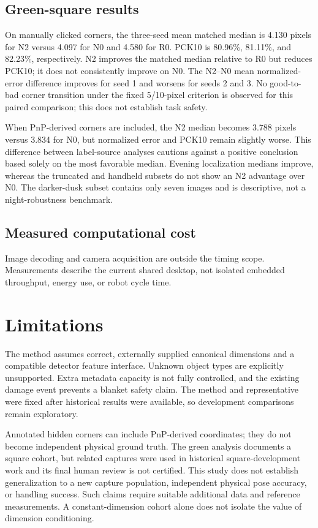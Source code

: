 \documentclass[journal]{IEEEtran}
\begin{document}
\subsection{Green-square results}

On manually clicked corners, the three-seed mean matched median is 4.130 pixels for N2 versus 4.097 for N0 and 4.580 for R0. PCK10 is 80.96\%, 81.11\%, and 82.23\%, respectively. N2 improves the matched median relative to R0 but reduces PCK10; it does not consistently improve on N0. The N2--N0 mean normalized-error difference improves for seed 1 and worsens for seeds 2 and 3. No good-to-bad corner transition under the fixed 5/10-pixel criterion is observed for this paired comparison; this does not establish task safety.

When PnP-derived corners are included, the N2 median becomes 3.788 pixels versus 3.834 for N0, but normalized error and PCK10 remain slightly worse. This difference between label-source analyses cautions against a positive conclusion based solely on the most favorable median. Evening localization medians improve, whereas the truncated and handheld subsets do not show an N2 advantage over N0. The darker-dusk subset contains only seven images and is descriptive, not a night-robustness benchmark.

\subsection{Measured computational cost}

Image decoding and camera acquisition are outside the timing scope. Measurements describe the current shared desktop, not isolated embedded throughput, energy use, or robot cycle time.

\section{Limitations}
The method assumes correct, externally supplied canonical dimensions and a compatible detector feature interface. Unknown object types are explicitly unsupported. Extra metadata capacity is not fully controlled, and the existing damage event prevents a blanket safety claim. The method and representative were fixed after historical results were available, so development comparisons remain exploratory.

Annotated hidden corners can include PnP-derived coordinates; they do not become independent physical ground truth. The green analysis documents a square cohort, but related captures were used in historical square-development work and its final human review is not certified. This study does not establish generalization to a new capture population, independent physical pose accuracy, or handling success. Such claims require suitable additional data and reference measurements. A constant-dimension cohort alone does not isolate the value of dimension conditioning.
\end{document}
